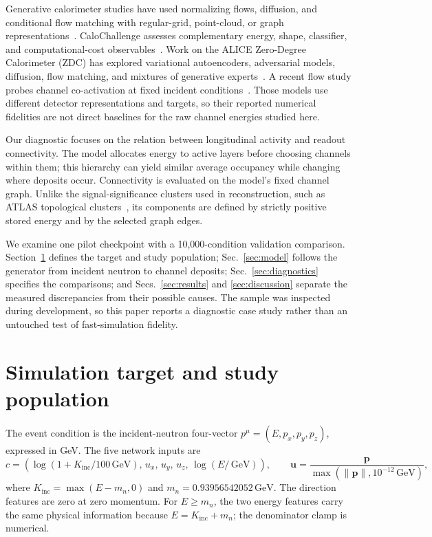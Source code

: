 \documentclass[11pt]{article}
\newcommand{\GeV}{\,\mathrm{GeV}}
\newcommand{\Kinc}{K_{\mathrm{inc}}}
\begin{document}
Generative calorimeter studies have used normalizing flows, diffusion, and conditional flow matching with regular-grid, point-cloud, or graph representations~\cite{caloflow,calodiffusion,calograph,caloclouds2,calodream}. CaloChallenge assesses complementary energy, shape, classifier, and computational-cost observables~\cite{calochallenge,kansalmetrics}. Work on the ALICE Zero-Degree Calorimeter (ZDC) has explored variational autoencoders, adversarial models, diffusion, flow matching, and mixtures of generative experts~\cite{dubinskizdc,kitazdc,fasterzdc,expertsim,wojnar2025}. A recent flow study probes channel co-activation at fixed incident conditions~\cite{majerz2026}. Those models use different detector representations and targets, so their reported numerical fidelities are not direct baselines for the raw channel energies studied here.

Our diagnostic focuses on the relation between longitudinal activity and readout connectivity. The model allocates energy to active layers before choosing channels within them; this hierarchy can yield similar average occupancy while changing where deposits occur. Connectivity is evaluated on the model's fixed channel graph. Unlike the signal-significance clusters used in reconstruction, such as ATLAS topological clusters~\cite{atlastopocluster}, its components are defined by strictly positive stored energy and by the selected graph edges.

We examine one pilot checkpoint with a 10,000-condition validation comparison. Section~\ref{sec:data} defines the target and study population; Sec.~\ref{sec:model} follows the generator from incident neutron to channel deposits; Sec.~\ref{sec:diagnostics} specifies the comparisons; and Secs.~\ref{sec:results} and \ref{sec:discussion} separate the measured discrepancies from their possible causes. The sample was inspected during development, so this paper reports a diagnostic case study rather than an untouched test of fast-simulation fidelity.

\section{Simulation target and study population}
\label{sec:data}

The event condition is the incident-neutron four-vector $p^\mu=(E,p_x,p_y,p_z)$, expressed in GeV. The five network inputs are
\begin{equation}
 c=\left(\log(1+\Kinc/100\GeV),\,u_x,\,u_y,\,u_z,\,\log(E/\GeV)\right),
 \qquad \mathbf u=\frac{\mathbf p}{\max(\lVert\mathbf p\rVert,10^{-12}\GeV)},
 \label{eq:condition}
\end{equation}
where $\Kinc=\max(E-m_n,0)$ and $m_n=0.93956542052\GeV$. The direction features are zero at zero momentum. For $E\geq m_n$, the two energy features carry the same physical information because $E=\Kinc+m_n$; the denominator clamp is numerical.
\end{document}
